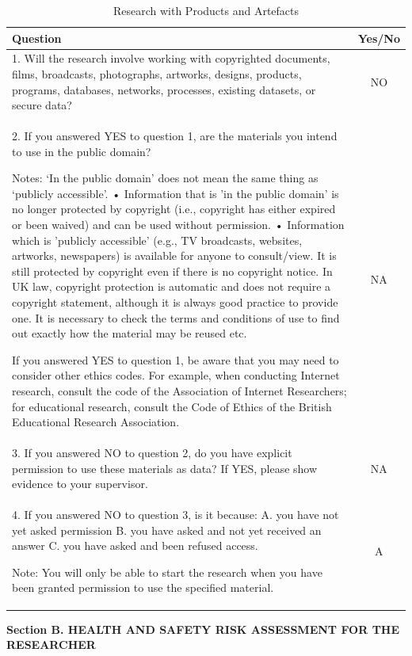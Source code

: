 \documentclass{article}
\begin{document}
\begin{table}
\centering
\begin{tabular}{|p{12cm}|c|}
\hline
Question & Yes/No \\
\hline
1. Will the research involve working with copyrighted documents, films, broadcasts, photographs, artworks, designs, products, programs, databases, networks, processes, existing datasets, or secure data? & NO \\
2. If you answered YES to question 1, are the materials you intend to use in the public domain?

Notes: ‘In the public domain’ does not mean the same thing as ‘publicly accessible’.
•	Information that is 'in the public domain' is no longer protected by copyright (i.e., copyright has either expired or been waived) and can be used without permission.
•	Information which is 'publicly accessible' (e.g., TV broadcasts, websites, artworks, newspapers) is available for anyone to consult/view. It is still protected by copyright even if there is no copyright notice. In UK law, copyright protection is automatic and does not require a copyright statement, although it is always good practice to provide one. It is necessary to check the terms and conditions of use to find out exactly how the material may be reused etc.

If you answered YES to question 1, be aware that you may need to consider other ethics codes. For example, when conducting Internet research, consult the code of the Association of Internet Researchers; for educational research, consult the Code of Ethics of the British Educational Research Association.
 & NA \\
3. If you answered NO to question 2, do you have explicit permission to use these materials as data?
If YES, please show evidence to your supervisor. & NA \\ 
\hline
4. If you answered NO to question 3, is it because: 
A. you have not yet asked permission
B. you have asked and not yet received an answer
C. you have asked and been refused access.

Note: You will only be able to start the research when you have been granted permission to use the specified material.
& A \\
\hline
\end{tabular}
\caption{Research with Products and Artefacts}
\end{table}


\newpage

\textbf{Section B. HEALTH AND SAFETY RISK ASSESSMENT FOR THE RESEARCHER}
\end{document}

